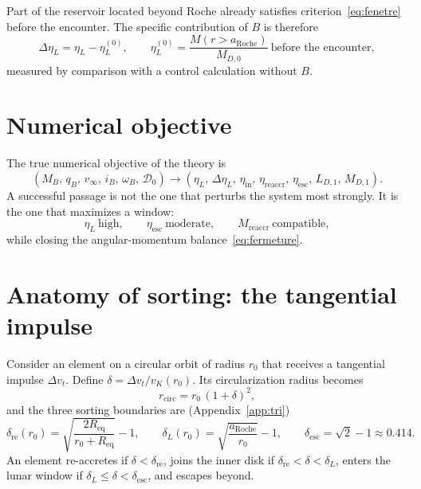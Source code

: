 \documentclass[11pt,a4paper,openany]{report}
\newcommand{\Req}{R_{\mathrm{eq}}}
\newcommand{\aR}{a_{\mathrm{Roche}}}
\begin{document}
Part of the reservoir located beyond Roche already satisfies criterion~\eqref{eq:fenetre} before
the encounter. The specific contribution of $B$ is therefore
\begin{equation}
\Delta\eta_L=\eta_L-\eta_L^{(0)},\qquad
\eta_L^{(0)}=\frac{M(r>\aR)}{M_{D,0}}\ \text{before the encounter},
\label{eq:DeltaetaL}
\end{equation}
measured by comparison with a control calculation without $B$.

\section{Numerical objective}

The true numerical objective of the theory is
\begin{equation}
\boxed{\;\left(M_B,\,q_B,\,v_\infty,\,i_B,\,\omega_B,\,\mathcal{D}_0\right)\longrightarrow
\left(\eta_L,\,\Delta\eta_L,\,\eta_{\mathrm{in}},\,\eta_{\mathrm{reaccr}},\,\eta_{\mathrm{esc}},\,
L_{D,1},\,M_{D,1}\right).\;}
\label{eq:objectif}
\end{equation}
A successful passage is not the one that perturbs the system most strongly. It is the one that
maximizes a window:
\begin{equation}
\boxed{\;\eta_L\ \text{high},\qquad \eta_{\mathrm{esc}}\ \text{moderate},\qquad
M_{\mathrm{reaccr}}\ \text{compatible},\;}
\label{eq:fenetre-succes}
\end{equation}
while closing the angular-momentum balance~\eqref{eq:fermeture}.

\section{Anatomy of sorting: the tangential impulse}

Consider an element on a circular orbit of radius $r_0$ that receives a tangential impulse
$\Delta v_t$. Define $\delta=\Delta v_t/v_K(r_0)$. Its circularization radius becomes
\begin{equation}
r_{\mathrm{circ}}=r_0\,(1+\delta)^2,
\label{eq:rcirc-delta}
\end{equation}
and the three sorting boundaries are (Appendix~\ref{app:tri})
\begin{equation}
\delta_{\mathrm{re}}(r_0)=\sqrt{\frac{2\Req}{r_0+\Req}}-1,\qquad
\delta_L(r_0)=\sqrt{\frac{\aR}{r_0}}-1,\qquad
\delta_{\mathrm{esc}}=\sqrt2-1\approx0.414.
\label{eq:frontieres}
\end{equation}
An element re-accretes if $\delta<\delta_{\mathrm{re}}$, joins the inner disk if
$\delta_{\mathrm{re}}<\delta<\delta_L$, enters the lunar window if
$\delta_L\le\delta<\delta_{\mathrm{esc}}$, and escapes beyond.
\end{document}
